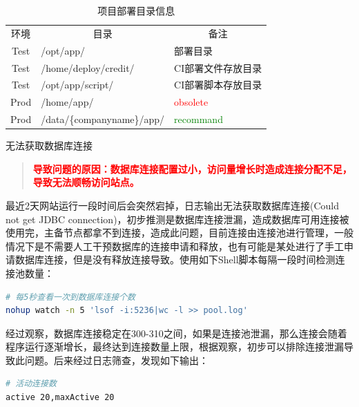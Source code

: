 \documentclass[8pt]{book}
\makeatletter
\numberwithin{dummy}{section}
\theoremstyle{ocrenumbox}
\theoremstyle{blacknumex}
\theoremstyle{blacknumbox}
\theoremstyle{ocrenum}
\renewcommand{\subsection}{\@startsection {subsection}{2}{\z@}
	{-3ex \@plus -0.1ex \@minus -.4ex}
	{0.5ex \@plus.2ex }
	{\normalfont\sffamily\bfseries}}
\makeatother
\begin{document}
\begin{table}[htbp]
	\caption{项目部署目录信息}
	\label{table:projectdirectionayinfo}
	\begin{center}
		\begin{tabular}{|c|p{4cm}|p{4cm}|}
			\hline
			\multirow{1}{*}{环境}
			& \multicolumn{1}{c|}{目录}
			& \multicolumn{1}{c|}{备注}\\			
			\cline{1-3}
			Test  & /opt/app/ & 部署目录 \\
			\hline
			Test  & /home/deploy/credit/ & CI部署文件存放目录 \\
			\hline
			Test  & /opt/app/script/ & CI部署脚本存放目录 \\
			\hline
			Prod  & /home/app/ & \textcolor{red}{obsolete} \\
			\hline
			Prod  & /data/\{companyname\}/app/ & \textcolor{green}{recommand} \\
			\hline							
		\end{tabular}	
	\end{center}
\end{table}


\subsection{无法获取数据库连接}

\begin{quote}
	\textbf{\textcolor{red}{导致问题的原因：数据库连接配置过小，访问量增长时造成连接分配不足，导致无法顺畅访问站点。}}
\end{quote}

最近2天网站运行一段时间后会突然宕掉，日志输出无法获取数据库连接(Could not get JDBC connection)，初步推测是数据库连接泄漏，造成数据库可用连接被使用完，主备节点都拿不到连接，造成此问题，目前连接由连接池进行管理，一般情况下是不需要人工干预数据库的连接申请和释放，也有可能是某处进行了手工申请数据库连接，但是没有释放连接导致。使用如下Shell脚本每隔一段时间检测连接池数量：

\begin{lstlisting}[language=Bash]
# 每5秒查看一次到数据库连接个数
nohup watch -n 5 'lsof -i:5236|wc -l >> pool.log'
\end{lstlisting}

经过观察，数据库连接稳定在300-310之间，如果是连接池泄漏，那么连接会随着程序运行逐渐增长，最终达到连接数量上限，根据观察，初步可以排除连接泄漏导致此问题。后来经过日志筛查，发现如下输出：

\begin{lstlisting}[language=Bash]
# 活动连接数
active 20,maxActive 20
\end{lstlisting}
\end{document}
